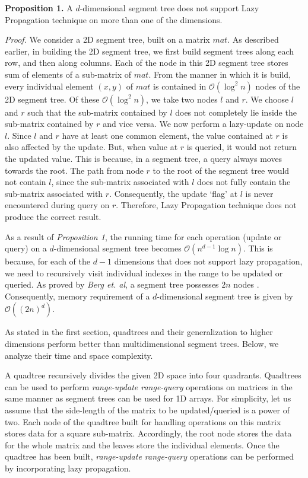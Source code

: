 \documentclass[a4paper]{article}
\begin{document}
\vspace{2 mm}
\noindent
\textbf{Proposition 1.} A $d$-dimensional segment tree does not support Lazy Propagation technique on more than one of the dimensions.

\vspace{1 mm}
\noindent
\textit{Proof.}
We consider a 2D segment tree, built on a matrix $mat$. As described earlier, in building the 2D segment tree, we first build segment trees along each row, and then along columns. Each of the node in this 2D segment tree stores sum of elements of a sub-matrix of $mat$. From the manner in which it is build, every individual element $(x, y)$ of $mat$ is contained in $\mathcal{O}(\log^2 n)$ nodes of the 2D segment tree. Of these $\mathcal{O}(\log^2 n)$, we take two nodes $l$ and $r$. We choose $l$ and $r$ such that the sub-matrix contained by $l$ does not completely lie inside the sub-matrix contained by $r$ and vice versa. We now perform a lazy-update on node $l$. Since $l$ and $r$ have at least one common element, the value contained at $r$ is also affected by the update. But, when value at $r$ is queried, it would not return the updated value. This is because, in a segment tree, a query always moves towards the root. The path from node $r$ to the root of the segment tree would not contain $l$, since the sub-matrix associated with $l$ does not fully contain the sub-matrix associated with $r$. Consequently, the update `flag' at $l$ is never encountered during query on $r$. Therefore, Lazy Propagation technique does not produce the correct result.

\vspace{2 mm}
As a result of \textit{Proposition 1}, the running time for each operation (update or query) on a $d$-dimensional segment tree becomes $\mathcal{O}(n^{d-1}\log n)$. This is because, for each of the $d-1$ dimensions that does not support lazy propagation, we need to recursively visit individual indexes in the range to be updated or queried. As proved by \textit{Berg et. al}, a segment tree possesses $2n$ nodes \cite[p. 226-227]{ST}. Consequently, memory requirement of a $d$-dimensional segment tree is given by $\mathcal{O}((2n)^d)$.

\vspace{2 mm}
As stated in the first section, quadtrees and their generalization to higher dimensions perform better than multidimensional segment trees. Below, we analyze their time and space complexity.

\vspace{2 mm}
A quadtree\cite{QT1} recursively divides the given 2D space into four quadrants. Quadtrees can be used to perform \textit{range-update range-query} operations on matrices in the same manner as segment trees can be used for 1D arrays. For simplicity, let us assume that the side-length of the matrix to be updated/queried is a power of two. Each node of the quadtree built for handling operations on this matrix stores data for a square sub-matrix.\cite{QT3} Accordingly, the root node stores the data for the whole matrix and the leaves store the individual elements. Once the quadtree has been built, \textit{range-update range-query} operations can be performed by incorporating lazy propagation.
\end{document}
